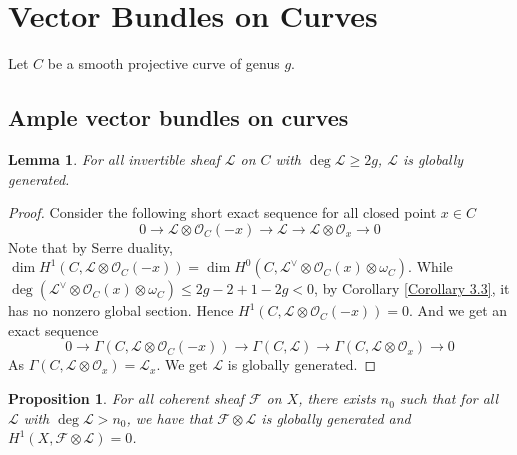 \documentclass{ctexart}
\newtheorem{proposition}{Proposition}[section]
\newtheorem{lemma}{Lemma}[section]
\begin{document}
\section{Vector Bundles on Curves}
\label{section:Vector_Bundles_on_Curves}

Let $C$ be a smooth projective curve of genus $g$.

\subsection{Ample vector bundles on curves}
\label{subsection:Vector_Bundles_on_Curves_Ample_vector_bundles_on_curves}

\begin{lemma}
    For all invertible sheaf $\mathcal{L}$ on $C$ with $\deg \mathcal{L} \ge 2g$, $\mathcal{L}$ is globally generated.
    \label{Lemma 5.1}
\end{lemma}
\begin{proof}
    Consider the following short exact sequence for all closed point $x\in C$
    \begin{equation}
        0 \longrightarrow \mathcal{L} \otimes \mathcal{O}_{C}(-x) \longrightarrow \mathcal{L} \longrightarrow \mathcal{L} \otimes \mathcal{O}_{x} \longrightarrow 0
    \end{equation}
    Note that by Serre duality, $\dim H^{1}(C, \mathcal{L} \otimes \mathcal{O}_{C}(-x)) = \dim H^{0}(C, \mathcal{L}^{\vee} \otimes \mathcal{O}_{C}(x) \otimes \omega_{C})$.
    While $\deg (\mathcal{L}^{\vee} \otimes \mathcal{O}_{C}(x) \otimes \omega_{C}) \le 2g - 2 + 1 - 2g < 0$,
    by Corollary \ref{Corollary 3.3}, it has no nonzero global section.
    Hence $H^{1}(C, \mathcal{L} \otimes \mathcal{O}_{C}(-x)) = 0$.
    And we get an exact sequence
    \begin{equation}
        0 \longrightarrow \Gamma(C, \mathcal{L} \otimes \mathcal{O}_{C}(-x)) \longrightarrow \Gamma(C, \mathcal{L}) \longrightarrow \Gamma(C, \mathcal{L} \otimes \mathcal{O}_{x}) \longrightarrow 0
    \end{equation}
    As $\Gamma(C, \mathcal{L} \otimes \mathcal{O}_{x}) = \mathcal{L}_{x}$.
    We get $\mathcal{L}$ is globally generated.
\end{proof}
\begin{proposition}
    For all coherent sheaf $\mathcal{F}$ on $X$, there exists $n_{0}$ such that for all $\mathcal{L}$ with $\deg \mathcal{L} > n_{0}$,
    we have that $\mathcal{F} \otimes \mathcal{L}$ is globally generated and $H^{1}(X, \mathcal{F} \otimes \mathcal{L}) = 0$.
    \label{Proposition 5.1}
\end{proposition}
\end{document}
